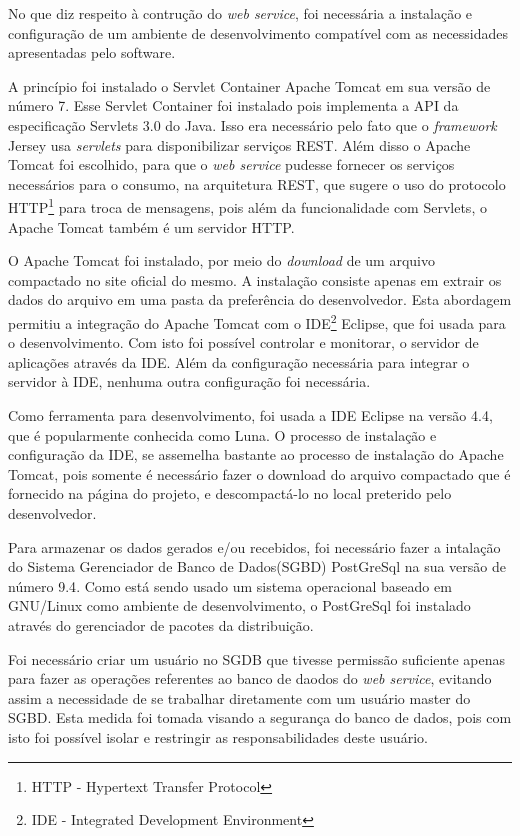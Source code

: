 	
	\par No que diz respeito à contrução do \textit{web service}, foi necessária a
instalação e configuração de um ambiente de desenvolvimento compatível com as
necessidades apresentadas pelo software.

	\par A princípio foi instalado o Servlet Container Apache Tomcat em sua versão
de número {7}. Esse Servlet Container foi instalado pois implementa a API da
especificação Servlets {3.0} do Java. Isso era necessário pelo fato que o
\textit{framework} Jersey usa \textit{servlets} para disponibilizar serviços
REST. Além disso o Apache Tomcat foi escolhido, para que o \textit{web service}
pudesse fornecer os serviços necessários para o consumo, na arquitetura REST,
que sugere o uso do protocolo HTTP\footnote{HTTP - Hypertext Transfer Protocol}
para troca de mensagens, pois além da funcionalidade com Servlets, o Apache
Tomcat também é um servidor HTTP.
	
	\par O Apache Tomcat foi instalado, por meio do \textit{download} de um
arquivo compactado no site oficial do mesmo. A instalação consiste apenas em
extrair os dados do arquivo em uma pasta da preferência do desenvolvedor.
Esta abordagem permitiu a integração do Apache Tomcat com o
IDE\footnote{IDE - Integrated Development Environment}
Eclipse, que foi usada para o desenvolvimento. Com isto foi possível controlar
e monitorar, o servidor de aplicações através da IDE. Além da configuração
necessária para integrar o servidor à IDE, nenhuma outra configuração foi
necessária.

	\par Como ferramenta para desenvolvimento, foi usada a IDE Eclipse na versão
{4.4}, que é popularmente conhecida como Luna. O processo de instalação e
configuração da IDE, se assemelha bastante ao processo de instalação do Apache
Tomcat, pois somente é necessário fazer o download do arquivo compactado que é
fornecido na página do projeto, e descompactá-lo no local preterido pelo
desenvolvedor.

	\par Para armazenar os dados gerados e/ou recebidos, foi necessário fazer a
intalação do Sistema Gerenciador de Banco de Dados(SGBD) PostGreSql na sua
versão de número {9.4}. Como está sendo usado um sistema operacional baseado em
GNU/Linux como ambiente de desenvolvimento, o PostGreSql foi instalado através
do gerenciador de pacotes da distribuição.
 
	\par Foi necessário criar um usuário no SGDB que tivesse permissão suficiente
apenas para fazer as operações referentes ao banco de daodos do \textit{web
service}, evitando assim a necessidade de se trabalhar diretamente com um
usuário master do SGBD. Esta medida foi tomada visando a segurança do banco de
dados, pois com isto foi possível isolar e restringir as responsabilidades deste
usuário.
